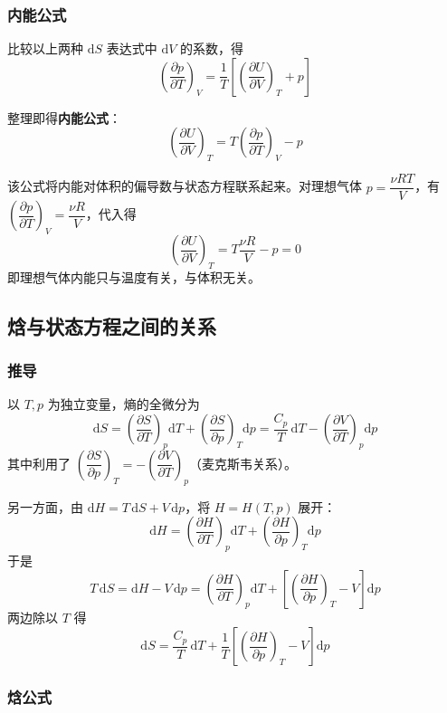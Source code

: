 \documentclass[UTF8]{ctexart}
\begin{document}
\subsubsection{内能公式}

比较以上两种 $\mathrm{d}S$ 表达式中 $\mathrm{d}V$ 的系数，得
\[
\left(\frac{\partial p}{\partial T}\right)_V
=\frac{1}{T}\left[\left(\frac{\partial U}{\partial V}\right)_T+p\right]
\]

整理即得\textbf{内能公式}：
\[
\boxed{\left(\frac{\partial U}{\partial V}\right)_T
=T\left(\frac{\partial p}{\partial T}\right)_V-p}
\]

该公式将内能对体积的偏导数与状态方程联系起来。对理想气体 $p=\dfrac{\nu RT}{V}$，有 $\left(\dfrac{\partial p}{\partial T}\right)_V=\dfrac{\nu R}{V}$，代入得
\[
\left(\frac{\partial U}{\partial V}\right)_T
=T\frac{\nu R}{V}-p=0
\]
即理想气体内能只与温度有关，与体积无关。


\subsection{焓与状态方程之间的关系}

\subsubsection{推导}

以 $T,p$ 为独立变量，熵的全微分为
\[
\mathrm{d}S=\left(\frac{\partial S}{\partial T}\right)_p\mathrm{d}T
+\left(\frac{\partial S}{\partial p}\right)_T\mathrm{d}p
=\frac{C_p}{T}\,\mathrm{d}T-\left(\frac{\partial V}{\partial T}\right)_p\mathrm{d}p
\]
其中利用了 $\left(\dfrac{\partial S}{\partial p}\right)_T=-\left(\dfrac{\partial V}{\partial T}\right)_p$（麦克斯韦关系）。

另一方面，由 $\mathrm{d}H=T\,\mathrm{d}S+V\,\mathrm{d}p$，将 $H=H(T,p)$ 展开：
\[
\mathrm{d}H=\left(\frac{\partial H}{\partial T}\right)_p\mathrm{d}T
+\left(\frac{\partial H}{\partial p}\right)_T\mathrm{d}p
\]
于是
\[
T\,\mathrm{d}S=\mathrm{d}H-V\,\mathrm{d}p
=\left(\frac{\partial H}{\partial T}\right)_p\mathrm{d}T
+\left[\left(\frac{\partial H}{\partial p}\right)_T-V\right]\mathrm{d}p
\]
两边除以 $T$ 得
\[
\mathrm{d}S=\frac{C_p}{T}\,\mathrm{d}T
+\frac{1}{T}\left[\left(\frac{\partial H}{\partial p}\right)_T-V\right]\mathrm{d}p
\]

\subsubsection{焓公式}
\end{document}

